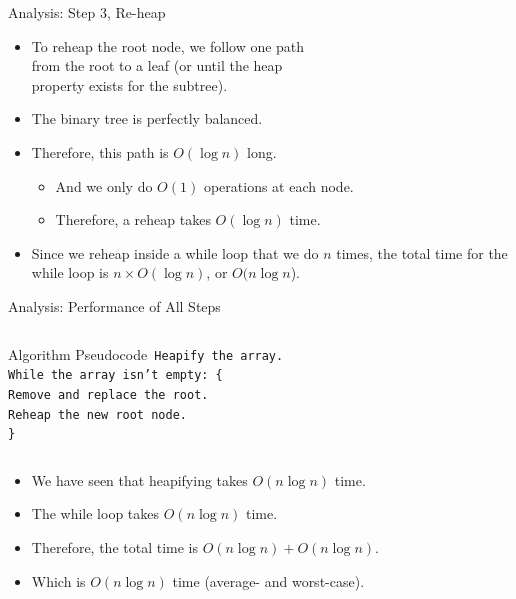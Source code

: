 \documentclass[14pt,aspectratio=1610]{beamer}
\begin{document}
\begin{frame}{Analysis: Step 3, Re-heap}
\begin{itemize}[<+->]
\item
  To reheap the root node, we follow {one path} \\
  from the root to a leaf (or until the heap \\
  property exists for the subtree).
\item
  The binary tree is perfectly balanced.
\item
  Therefore, this path is \(O(\log n)\) long.
  \begin{itemize}
  \item
    And we only do \(O(1)\) operations at each node.
  \item
    Therefore, a reheap takes \(O(\log n)\) time.
  \end{itemize}
\item
  Since we reheap inside a while loop that we do \(n\) times, the total time for the while loop is \(n \times O(\log n)\), or \(O(n \log n\)).
\end{itemize}
\end{frame}

\begin{frame}{Analysis: Performance of All Steps}
\begin{columns}
  \begin{block}{Algorithm Pseudocode}\texttt{%
    Heapify the array.\\
    While the array isn't empty: \{\\
    \hspace{2em}Remove and replace the root.\\
    \hspace{2em}Reheap the new root node.\\
    \}}
  \end{block}
\end{columns}
\begin{itemize}
\item<+->
  We have seen that heapifying takes \(O(n \log n)\) time.
\item<+->
  The while loop takes \(O(n \log n)\) time.
\item<+->
  Therefore, the total time is \(O(n \log n) + O(n \log n)\).
\item<+->
  Which is \(O(n \log n)\) time (average- and worst-case).
\end{itemize}
\end{frame}
\end{document}
